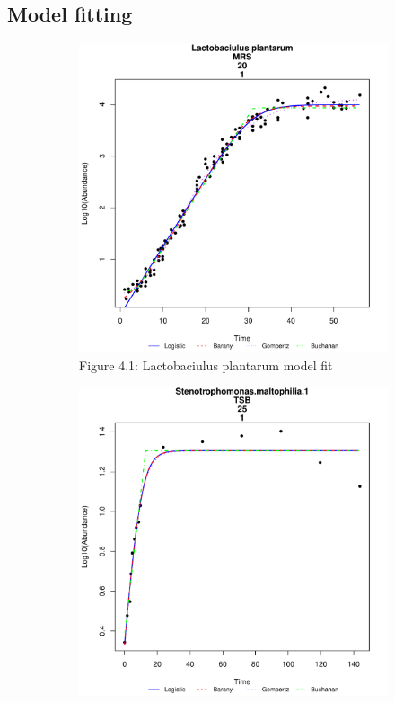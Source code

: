 \documentclass[11pt]{article}
\begin{document}
\subsection{Model fitting}
\begin{figure}[h!]
    \centering
    \begin{subfigure}[h]{0.4\textwidth}
        \includegraphics[width=\textwidth]{../Results/Lplantarum_fit.pdf}
        \caption{Figure 4.1: Lactobaciulus plantarum model fit}
        \label{fig:Lactobaciulus plantarum}
    \end{subfigure}
    \hfill
    \begin{subfigure}[h]{0.4\textwidth}
        \includegraphics[width=\textwidth]{../Results/Smaltophilia25_fit.pdf}

\end{subfigure}
\end{figure}
\end{document}
